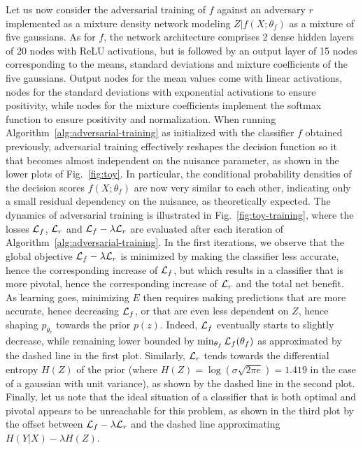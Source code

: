 \documentclass[twocolumn,superscriptaddress,aps]{revtex4-1}
\theoremstyle{plain}
\begin{document}
Let us now consider the adversarial training of $f$ against an adversary $r$
implemented as a mixture density network modeling $Z|f(X;\theta_f)$ as a mixture
of five gaussians. As for $f$, the network architecture comprises 2 dense hidden
layers of 20 nodes with ReLU activations, but is followed by an output layer of
15 nodes corresponding to the means, standard deviations and mixture
coefficients of the five gaussians. Output nodes for the mean values come with
linear activations, nodes for the standard deviations with exponential
activations to ensure positivity, while nodes for the mixture coefficients
implement the softmax function to ensure positivity and normalization. When
running Algorithm~\ref{alg:adversarial-training} as initialized with the
classifier $f$ obtained previously, adversarial training effectively reshapes
the decision function so it that becomes almost independent on the nuisance
parameter, as shown in the lower plots of Fig.~\ref{fig:toy}. In particular,
the conditional probability densities of the decision scores $f(X;\theta_f)$ are
now very similar to each other, indicating only a small residual  dependency on the
nuisance, as theoretically expected. The dynamics of adversarial training is
illustrated in Fig.~\ref{fig:toy-training}, where the losses ${\cal L}_f$,
${\cal L}_r$ and ${\cal L}_f - \lambda {\cal L}_r$ are evaluated after each
iteration of Algorithm~\ref{alg:adversarial-training}. In the first iterations,
we observe that the global objective ${\cal L}_f - \lambda {\cal L}_r$ is
minimized by making the classifier less accurate, hence the corresponding
increase of ${\cal L}_f$, but which results in a classifier that is more
pivotal, hence the corresponding increase of ${\cal L}_r$ and the total net
benefit. As learning goes, minimizing $E$ then requires making predictions that
are more accurate, hence decreasing ${\cal L}_f$, or that are even less dependent on
$Z$, hence shaping $p_{\theta_r}$ towards the prior $p(z)$. Indeed, ${\cal L}_f$
eventually starts to slightly decrease, while remaining lower bounded by
$\min_{\theta_f} {\cal L}_f(\theta_f)$ as approximated by the dashed line in the
first plot. Similarly,  ${\cal L}_r$ tends towards the differential entropy
$H(Z)$ of the prior (where $H(Z) = \log(\sigma \sqrt{2 \pi e}) = 1.419$ in the
case of a gaussian with unit variance), as shown by the dashed line in the
second plot.
Finally, let us note that the ideal situation of a
classifier that is both optimal and pivotal appears to be unreachable for this
problem, as shown in the third plot by the  offset between ${\cal L}_f - \lambda
{\cal L}_r$ and the dashed line approximating $H({Y|X}) -
\lambda H(Z)$.
\end{document}
